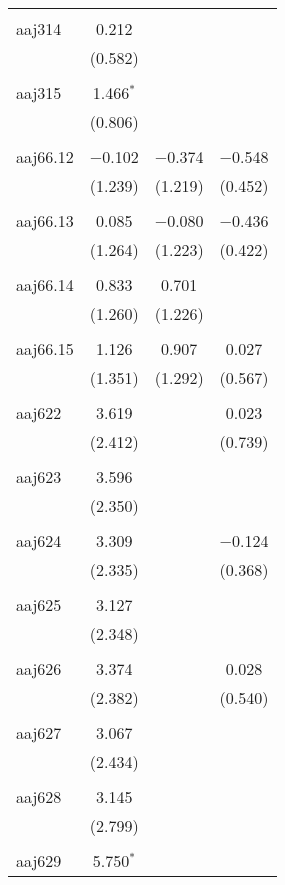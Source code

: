 \begin{table}[!htbp]
\begin{tabular}{@{\extracolsep{5pt}}lccc}
  & & & \\ 
 aaj314 & 0.212 &  &  \\ 
  & (0.582) &  &  \\ 
  & & & \\ 
 aaj315 & 1.466$^{*}$ &  &  \\ 
  & (0.806) &  &  \\ 
  & & & \\ 
 aaj66.12 & $-$0.102 & $-$0.374 & $-$0.548 \\ 
  & (1.239) & (1.219) & (0.452) \\ 
  & & & \\ 
 aaj66.13 & 0.085 & $-$0.080 & $-$0.436 \\ 
  & (1.264) & (1.223) & (0.422) \\ 
  & & & \\ 
 aaj66.14 & 0.833 & 0.701 &  \\ 
  & (1.260) & (1.226) &  \\ 
  & & & \\ 
 aaj66.15 & 1.126 & 0.907 & 0.027 \\ 
  & (1.351) & (1.292) & (0.567) \\ 
  & & & \\ 
 aaj622 & 3.619 &  & 0.023 \\ 
  & (2.412) &  & (0.739) \\ 
  & & & \\ 
 aaj623 & 3.596 &  &  \\ 
  & (2.350) &  &  \\ 
  & & & \\ 
 aaj624 & 3.309 &  & $-$0.124 \\ 
  & (2.335) &  & (0.368) \\ 
  & & & \\ 
 aaj625 & 3.127 &  &  \\ 
  & (2.348) &  &  \\ 
  & & & \\ 
 aaj626 & 3.374 &  & 0.028 \\ 
  & (2.382) &  & (0.540) \\ 
  & & & \\ 
 aaj627 & 3.067 &  &  \\ 
  & (2.434) &  &  \\ 
  & & & \\ 
 aaj628 & 3.145 &  &  \\ 
  & (2.799) &  &  \\ 
  & & & \\ 
 aaj629 & 5.750$^{*}$ &  &  \\ 

\end{tabular}
\end{table}
